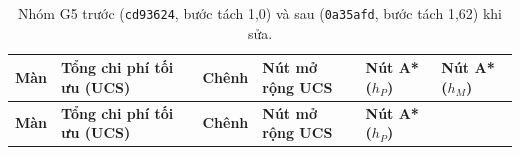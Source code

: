 \begin{longtable}[]{@{}
  >{\raggedright\arraybackslash}p{}
  >{\raggedright\arraybackslash}p{}
  >{\raggedright\arraybackslash}p{}
  >{\raggedright\arraybackslash}p{}
  >{\raggedright\arraybackslash}p{}
  >{\raggedright\arraybackslash}p{}@{}}
\caption{ Nhóm G5 trước (\texttt{cd93624}, bước tách 1,0) và sau (\texttt{0a35afd}, bước tách 1,62) khi sửa.}\tabularnewline
\toprule\noalign{}
\rowcolor{tablehead}\begin{minipage}[b]{\linewidth}\raggedright
\textbf{Màn}
\end{minipage} & \begin{minipage}[b]{\linewidth}\raggedright
\textbf{Tổng chi phí tối ưu (UCS)}
\end{minipage} & \begin{minipage}[b]{\linewidth}\raggedright
\textbf{Chênh}
\end{minipage} & \begin{minipage}[b]{\linewidth}\raggedright
\textbf{Nút mở rộng UCS}
\end{minipage} & \begin{minipage}[b]{\linewidth}\raggedright
\textbf{Nút A* (\(h_P\))}
\end{minipage} & \begin{minipage}[b]{\linewidth}\raggedright
\textbf{Nút A* (\(h_M\))}
\end{minipage} \\
\midrule\noalign{}
\endfirsthead
\toprule\noalign{}
\rowcolor{tablehead}\begin{minipage}[b]{\linewidth}\raggedright
\textbf{Màn}
\end{minipage} & \begin{minipage}[b]{\linewidth}\raggedright
\textbf{Tổng chi phí tối ưu (UCS)}
\end{minipage} & \begin{minipage}[b]{\linewidth}\raggedright
\textbf{Chênh}
\end{minipage} & \begin{minipage}[b]{\linewidth}\raggedright
\textbf{Nút mở rộng UCS}
\end{minipage} & \begin{minipage}[b]{\linewidth}\raggedright
\textbf{Nút A* (\(h_P\))}

\end{minipage}
\end{longtable}
